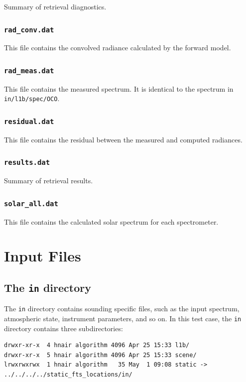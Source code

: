 \documentclass{article}
\begin{document}
Summary of retrieval diagnostics.

\subsubsection{\texttt{rad\_conv.dat}}

This file contains the convolved radiance calculated by the forward
model. 

\subsubsection{\texttt{rad\_meas.dat}}

This file contains the measured spectrum.  It is identical to the
spectrum in \texttt{in/l1b/spec/OCO}.

\subsubsection{\texttt{residual.dat}}

This file contains the residual between the measured and computed radiances.

\subsubsection{\texttt{results.dat}}

Summary of retrieval results.

\subsubsection{\texttt{solar\_all.dat}}

This file contains the calculated solar spectrum for each spectrometer.

\section{Input Files}

\subsection{The \texttt{in} directory}

The \texttt{in} directory contains sounding specific files, such as
the input spectrum, atmospheric state, instrument parameters, and so
on.  In this test case, the \texttt{in} directory contains three
subdirectories:

\begin{verbatim}
drwxr-xr-x  4 hnair algorithm 4096 Apr 25 15:33 l1b/
drwxr-xr-x  5 hnair algorithm 4096 Apr 25 15:33 scene/
lrwxrwxrwx  1 hnair algorithm   35 May  1 09:08 static -> ../../../../static_fts_locations/in/
\end{verbatim}
\end{document}

